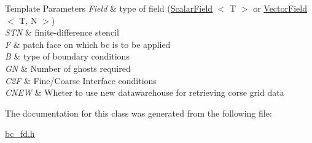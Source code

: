 \begin{DoxyTemplParams}{Template Parameters}
{\em Field} & type of field (\hyperlink{structUintah_1_1PhaseField_1_1ScalarField}{Scalar\+Field} $<$ T $>$ or \hyperlink{structUintah_1_1PhaseField_1_1VectorField}{Vector\+Field} $<$ T, N $>$) \\
\hline
{\em S\+TN} & finite-\/difference stencil \\
\hline
{\em F} & patch face on which bc is to be applied \\
\hline
{\em B} & type of boundary conditions \\
\hline
{\em GN} & Number of ghosts required \\
\hline
{\em C2F} & Fine/\+Coarse Interface conditions \\
\hline
{\em C\+N\+EW} & Wheter to use new datawarehouse for retrieving corse grid data \\
\hline
\end{DoxyTemplParams}


The documentation for this class was generated from the following file\+:\begin{DoxyCompactItemize}
\item 
\hyperlink{bc__fd_8h}{bc\+\_\+fd.\+h}\end{DoxyCompactItemize}
